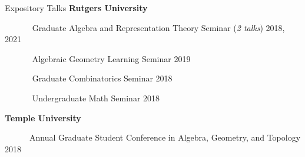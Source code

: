 \documentclass{resume} %
\begin{document}
\begin{rSection}{Expository Talks}
    {\bf Rutgers University}

    \mbox{\ \ \ \ \ \ } Graduate Algebra and Representation Theory Seminar (\emph{2 talks}) \hfill{2018, 2021}

    \mbox{\ \ \ \ \ \ } Algebraic Geometry Learning Seminar \hfill{2019}

    

    \mbox{\ \ \ \ \ \ } Graduate Combinatorics Seminar \hfill{2018}

    \mbox{\ \ \ \ \ \ } Undergraduate Math Seminar \hfill{2018}

    {\bf Temple University}

    \mbox{\ \ \ \ \ \ }Annual Graduate Student Conference in Algebra, Geometry, and Topology \hfill{2018}
\end{rSection}








    




    
\end{document}
